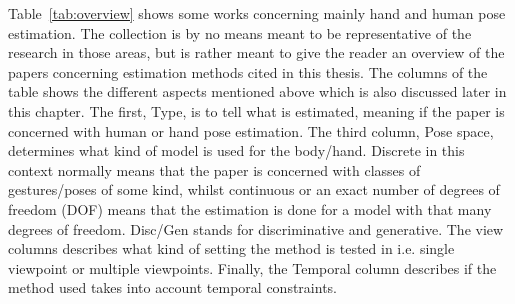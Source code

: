\documentclass[a4paper,11pt]{kth-mag}
\begin{document}
Table~\ref{tab:overview} shows some works concerning mainly hand and human pose estimation.
The collection is by no means meant to be representative of the research in those areas, but is rather meant to give the reader an overview of the papers concerning estimation methods cited in this thesis.
The columns of the table shows the different aspects mentioned above which is also discussed later in this chapter.
The first, Type, is to tell what is estimated, meaning if the paper is concerned with human or hand pose estimation.
The third column, Pose space, determines what kind of model is used for the body/hand.
Discrete in this context normally means that the paper is concerned with classes of gestures/poses of some kind, whilst continuous or an exact number of degrees of freedom (DOF) means that the estimation is done for a model with that many degrees of freedom.
Disc/Gen stands for discriminative and generative.
The view columns describes what kind of setting the method is tested in i.e. single viewpoint or multiple viewpoints.
Finally, the Temporal column describes if the method used takes into account temporal constraints.
\end{document}
